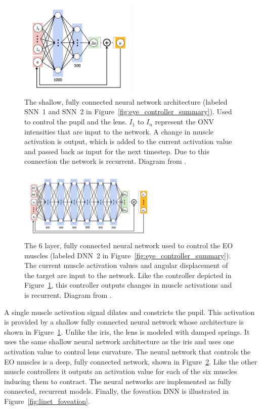\documentclass [MS] {UCLAthesis}
\begin{document}
\begin{figure}
    \centering
    \includegraphics[width=0.5\textwidth]{controller_shallow}
    \caption[Shallow, fully connected pupil and lens controller]{The shallow, fully connected neural network architecture (labeled SNN~1 and SNN~2 in Figure~\ref{fig:eye_controller_summary}). Used to control the pupil and the lens. $I_1$ to $I_n$ represent the ONV intensities that are input to the network. A change in muscle activation is output, which is added to the current activation value and passed back as input for the next timestep. Due to this connection the network is recurrent. Diagram from \citep{Arjun}.}
    \label{fig:controller_shallow}
\end{figure}

\begin{figure}
    \centering
    \includegraphics[width=0.6\textwidth]{controller_deep}
    \caption[Deep, fully connected EO muscle controller]{The 6 layer, fully connected neural network used to control the EO muscles (labeled DNN~2 in Figure~\ref{fig:eye_controller_summary}). The current muscle activation values and angular displacement of the target are input to the network. Like the controller depicted in Figure~\ref{fig:controller_shallow}, this controller outputs changes in muscle activations and is recurrent. Diagram from \citep{Arjun}.}
    \label{fig:controller_deep}
\end{figure}

A single muscle activation signal dilates and constricts the pupil. This activation is provided by a shallow fully connected neural network whose architecture is shown in Figure~\ref{fig:controller_shallow}. Unlike the iris, the lens is modeled with damped springs. It uses the same shallow neural network architecture as the iris and uses one activation value to control lens curvature. The neural network that controls the EO muscles is a deep, fully connected network, shown in Figure~\ref{fig:controller_deep}. Like the other muscle controllers it outputs an activation value for each of the six muscles inducing them to contract. The neural networks are implemented as fully connected, recurrent models. Finally, the foveation DNN is illustrated in Figure~\ref{fig:linet_foveation}.
\end{document}
